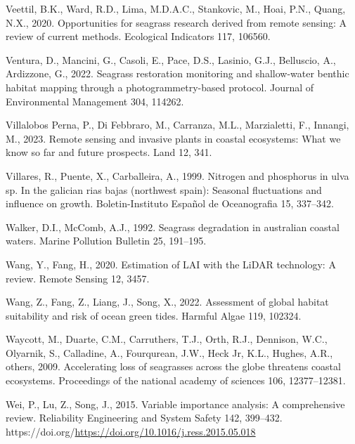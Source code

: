 \documentclass[
  letterpaper,
  11pt,
  english,
  singlespacing,
  headsepline]{MastersDoctoralThesis}
\newlength{\cslhangindent}
\newenvironment{CSLReferences}[2] %
 {\begin{list}{}{%
  \setlength{\itemindent}{0pt}
  \setlength{\leftmargin}{0pt}
  \setlength{\parsep}{0pt}
  \ifodd #1
   \setlength{\leftmargin}{\cslhangindent}
   \setlength{\itemindent}{-1\cslhangindent}
  \fi
  \setlength{\itemsep}{#2\baselineskip}}}
 {\end{list}}
\begin{document}
\begin{CSLReferences}{1}{0}
Veettil, B.K., Ward, R.D., Lima, M.D.A.C., Stankovic, M., Hoai, P.N.,
Quang, N.X., 2020. Opportunities for seagrass research derived from
remote sensing: A review of current methods. Ecological Indicators 117,
106560.

Ventura, D., Mancini, G., Casoli, E., Pace, D.S., Lasinio, G.J.,
Belluscio, A., Ardizzone, G., 2022. Seagrass restoration monitoring and
shallow-water benthic habitat mapping through a photogrammetry-based
protocol. Journal of Environmental Management 304, 114262.

Villalobos Perna, P., Di Febbraro, M., Carranza, M.L., Marzialetti, F.,
Innangi, M., 2023. Remote sensing and invasive plants in coastal
ecosystems: What we know so far and future prospects. Land 12, 341.

Villares, R., Puente, X., Carballeira, A., 1999. Nitrogen and phosphorus
in ulva sp. In the galician rias bajas (northwest spain): Seasonal
fluctuations and influence on growth. Boletin-Instituto Espa{ñ}ol de
Oceanografia 15, 337--342.

Walker, D.I., McComb, A.J., 1992. Seagrass degradation in australian
coastal waters. Marine Pollution Bulletin 25, 191--195.

Wang, Y., Fang, H., 2020. Estimation of LAI with the LiDAR technology: A
review. Remote Sensing 12, 3457.

Wang, Z., Fang, Z., Liang, J., Song, X., 2022. Assessment of global
habitat suitability and risk of ocean green tides. Harmful Algae 119,
102324.

Waycott, M., Duarte, C.M., Carruthers, T.J., Orth, R.J., Dennison, W.C.,
Olyarnik, S., Calladine, A., Fourqurean, J.W., Heck Jr, K.L., Hughes,
A.R., others, 2009. Accelerating loss of seagrasses across the globe
threatens coastal ecosystems. Proceedings of the national academy of
sciences 106, 12377--12381.

Wei, P., Lu, Z., Song, J., 2015. Variable importance analysis: A
comprehensive review. Reliability Engineering and System Safety 142,
399--432.
https://doi.org/\url{https://doi.org/10.1016/j.ress.2015.05.018}


\end{CSLReferences}
\end{document}
